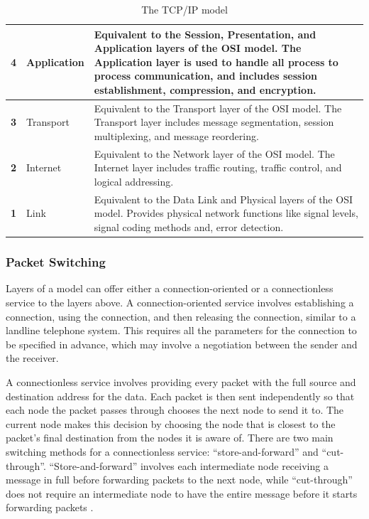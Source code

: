 \begin{table}[!ht]
  \begin{center}
    \begin{tabularx}{\textwidth}{|c|l|X|}
      \hline
      \textbf{4} & Application & Equivalent to the Session, Presentation, and Application layers of the OSI model. The Application layer is used to handle all process to process communication, and includes session establishment, compression, and encryption. \\ \hline
      \textbf{3} & Transport & Equivalent to the Transport layer of the OSI model. The Transport layer includes message segmentation, session multiplexing, and message reordering. \\ \hline
      \textbf{2} & Internet & Equivalent to the Network layer of the OSI model. The Internet layer includes traffic routing, traffic control, and logical addressing. \\ \hline
      \textbf{1} & Link & Equivalent to the Data Link and Physical layers of the OSI model. Provides physical network functions like signal levels, signal coding methods and, error detection. \\ \hline
    \end{tabularx}
  \end{center}
  \caption{The TCP/IP model \cite{tcpip_pearson}}
  \label{tcp_ip_model}
\end{table}

\subsubsection{Packet Switching}
Layers of a model can offer either a connection-oriented or a connectionless service to the layers above. A connection-oriented service involves establishing a connection, using the connection, and then releasing the connection, similar to a landline telephone system. This requires all the parameters for the connection to be specified in advance, which may involve a negotiation between the sender and the receiver.

A connectionless service involves providing every packet with the full source and destination address for the data. Each packet is then sent independently so that each node the packet passes through chooses the next node to send it to. The current node makes this decision by choosing the node that is closest to the packet's final destination from the nodes it is aware of. There are two main switching methods for a connectionless service: ``store-and-forward'' and ``cut-through''. ``Store-and-forward'' involves each intermediate node receiving a message in full before forwarding packets to the next node, while ``cut-through'' does not require an intermediate node to have the entire message before it starts forwarding packets \cite{tanenbaum}.


